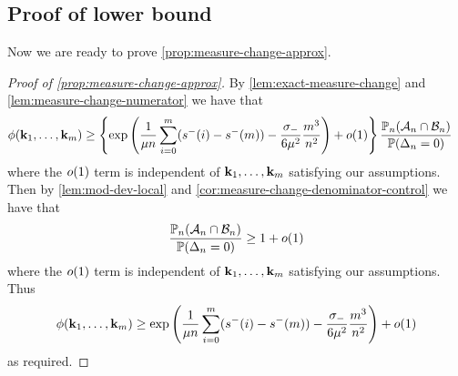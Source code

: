 \subsection{Proof of lower bound}

Now we are ready to prove \cref{prop:measure-change-approx}.

\begin{proof}[Proof of \cref{prop:measure-change-approx}]
    By \cref{lem:exact-measure-change} and \cref{lem:measure-change-numerator} we have that
    \begin{align*}
        \phi({\mathbf k}_1, \ldots, {\mathbf k}_m)
        &\geq \left\{ \exp\left(
            \frac{1}{\mu n} \sum_{i=0}^m (s^-(i) - s^-(m)) - \frac{\sigma_-}{6 \mu^2} \frac{m^3}{n^2}
        \right) + o(1) \right\} \frac{{\mathbb P}_n(\mathcal A_n \cap \mathcal B_n)}{{\mathbb P}(\Delta_n = 0)}
    \end{align*}
    where the $o(1)$ term is independent of ${\mathbf k}_1, \ldots, {\mathbf k}_m$ satisfying our assumptions. Then by \cref{lem:mod-dev-local} and \cref{cor:measure-change-denominator-control} we have that
    \begin{equation*}
        \frac{{\mathbb P}_n(\mathcal A_n \cap \mathcal B_n)}{{\mathbb P}(\Delta_n = 0)} \geq 1 + o(1)
    \end{equation*}
    where the $o(1)$ term is independent of ${\mathbf k}_1, \ldots, {\mathbf k}_m$ satisfying our assumptions. Thus
    \begin{equation*}
        \phi({\mathbf k}_1, \ldots, {\mathbf k}_m) \geq
        \exp\left(
            \frac{1}{\mu n} \sum_{i=0}^m (s^-(i) - s^-(m)) - \frac{\sigma_-}{6 \mu^2} \frac{m^3}{n^2}
        \right) + o(1)
    \end{equation*}
    as required.
\end{proof}
